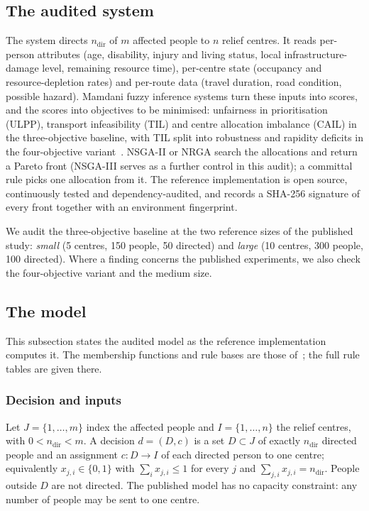 \documentclass[systems,article,submit,moreauthors,pdftex]{Definitions/mdpi}
\begin{document}
\subsection{The audited system}
The system directs $n_{\mathrm{dir}}$ of $m$ affected people to $n$ relief centres. It
reads per-person attributes (age, disability, injury and living status, local
infrastructure-damage level, remaining resource time), per-centre state (occupancy and
resource-depletion rates) and per-route data (travel duration, road condition, possible
hazard). Mamdani fuzzy inference systems turn these inputs into scores, and the scores
into objectives to be minimised: unfairness in prioritisation (ULPP), transport
infeasibility (TIL) and centre allocation imbalance (CAIL) in the three-objective
baseline, with TIL split into robustness and rapidity deficits in the four-objective
variant~\cite{rabiei2026resilient}. NSGA-II or NRGA search the allocations and return a
Pareto front (NSGA-III serves as a further control in this audit); a committal rule picks one allocation from it. The reference
implementation is open source, continuously tested and dependency-audited, and records a
SHA-256 signature of every front together with an environment fingerprint.

We audit the three-objective baseline at the two reference sizes of the published study:
\emph{small} (5 centres, 150 people, 50 directed) and \emph{large} (10 centres, 300
people, 100 directed). Where a finding concerns the published experiments, we also check
the four-objective variant and the medium size.

\subsection{The model}\label{sec:model}
This subsection states the audited model as the reference implementation computes it. The
membership functions and rule bases are those of~\cite{rabiei2026resilient}; the full rule
tables are given there.

\subsubsection{Decision and inputs}
Let $J=\{1,\dots,m\}$ index the affected people and $I=\{1,\dots,n\}$ the relief centres, with
$0<n_{\mathrm{dir}}<m$. A decision $d=(D,c)$ is a set $D\subset J$ of exactly $n_{\mathrm{dir}}$
directed people and an assignment $c\colon D\to I$ of each directed person to one centre;
equivalently $x_{j,i}\in\{0,1\}$ with $\sum_{i}x_{j,i}\le 1$ for every $j$ and
$\sum_{j,i}x_{j,i}=n_{\mathrm{dir}}$. People outside $D$ are not directed. The published model
has no capacity constraint: any number of people may be sent to one centre.
\end{document}
